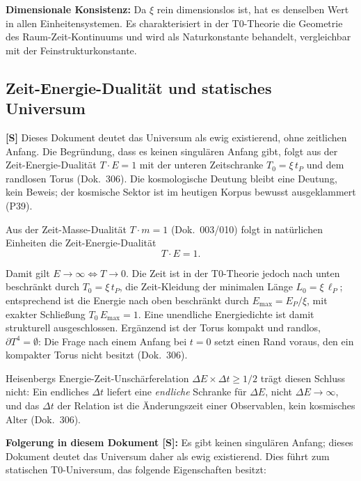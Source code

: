 	\textbf{Dimensionale Konsistenz:} Da $\xi$ rein dimensionslos ist, hat es denselben Wert in allen Einheitensystemen. Es charakterisiert in der T0-Theorie die Geometrie des Raum-Zeit-Kontinuums und wird als Naturkonstante behandelt, vergleichbar mit der Feinstrukturkonstante.
	
	\subsection{Zeit-Energie-Dualität und statisches Universum}
	
	\begin{important}
		\textbf{[S]} Dieses Dokument deutet das Universum als ewig existierend, ohne zeitlichen Anfang. Die Begründung, dass es keinen singulären Anfang gibt, folgt aus der Zeit-Energie-Dualität $T\cdot E = 1$ mit der unteren Zeitschranke $T_0 = \xi\,t_P$ und dem randlosen Torus (Dok.~306). Die kosmologische Deutung bleibt eine Deutung, kein Beweis; der kosmische Sektor ist im heutigen Korpus bewusst ausgeklammert (P39).
	\end{important}
	
	Aus der Zeit-Masse-Dualität $T\cdot m = 1$ (Dok.~003/010) folgt in natürlichen Einheiten die Zeit-Energie-Dualität
	\begin{equation}
		T \cdot E = 1 .
	\end{equation}
	
	Damit gilt $E\to\infty \Leftrightarrow T\to 0$. Die Zeit ist in der T0-Theorie jedoch nach unten beschränkt durch $T_0 = \xi\,t_P$, die Zeit-Kleidung der minimalen Länge $L_0 = \xi\,\ell_P$; entsprechend ist die Energie nach oben beschränkt durch $E_\text{max} = E_P/\xi$, mit exakter Schließung $T_0\,E_\text{max} = 1$. Eine unendliche Energiedichte ist damit strukturell ausgeschlossen. Ergänzend ist der Torus kompakt und randlos, $\partial T^4 = \emptyset$: Die Frage nach einem Anfang bei $t=0$ setzt einen Rand voraus, den ein kompakter Torus nicht besitzt (Dok.~306).
	
	Heisenbergs Energie-Zeit-Unschärferelation $\Delta E \times \Delta t \geq 1/2$ trägt diesen Schluss nicht: Ein endliches $\Delta t$ liefert eine \emph{endliche} Schranke für $\Delta E$, nicht $\Delta E\to\infty$, und das $\Delta t$ der Relation ist die Änderungszeit einer Observablen, kein kosmisches Alter (Dok.~306).
	
	\textbf{Folgerung in diesem Dokument [S]:} Es gibt keinen singulären Anfang; dieses Dokument deutet das Universum daher als ewig existierend. Dies führt zum statischen T0-Universum, das folgende Eigenschaften besitzt:
	
